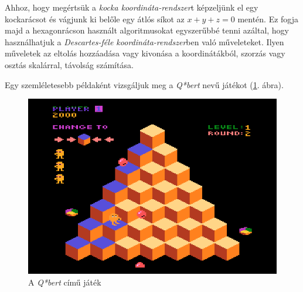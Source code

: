 Ahhoz, hogy megértsük a \textit{kocka koordináta-rendszer}t képzeljünk el egy kockarácsot és vágjunk ki belőle egy átlós síkot az $x + y + z = 0$ mentén. Ez fogja majd a hexagonrácson használt algoritmusokat egyszerűbbé tenni azáltal, hogy használhatjuk a \textit{Descartes-féle koordináta-rendszer}ben való műveleteket. Ilyen műveletek az eltolás hozzáadása vagy kivonása a  koordinátákból, szorzás vagy osztás skalárral, távolság számítása.

Egy szemléletesebb példaként vizsgáljuk meg a \textit{Q*bert} nevű játékot (\ref{fig:Qbert}. ábra).

\begin{figure}[h!]
\centering
\includegraphics[scale=0.5]{kepek/Qbert.png}
\caption{A \textit{Q*bert} című játék}
\label{fig:Qbert}
\end{figure}

